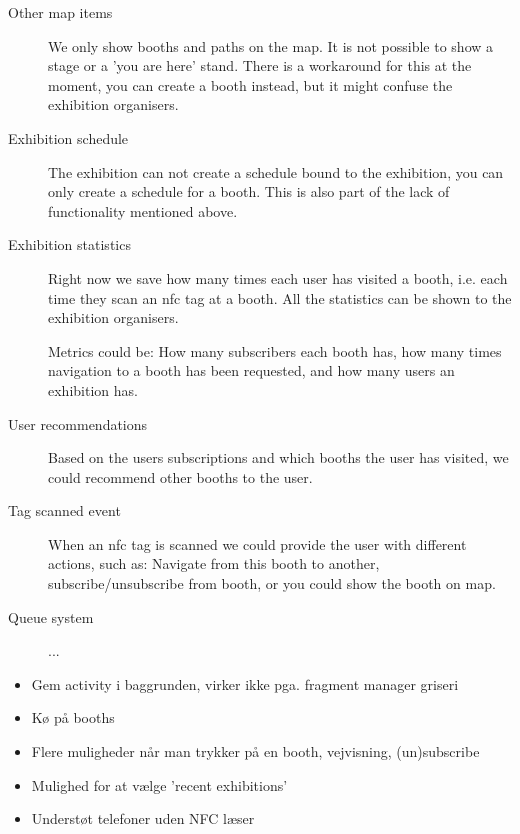 \begin{description}
\item[Other map items] We only show booths and paths on the map. It is not possible to show a stage or a 'you are here' stand. There is a workaround for this at the moment, you can create a booth instead, but it might confuse the exhibition organisers.
\item[Exhibition schedule] The exhibition can not create a schedule bound to the exhibition, you can only create a schedule for a booth. This is also part of the lack of functionality mentioned above.
\item[Exhibition statistics] Right now we save how many times each user has visited a booth, i.e. each time they scan an \ac{nfc} tag at a booth. All the statistics can be shown to the exhibition organisers.

Metrics could be: How many subscribers each booth has, how many times navigation to a booth has been requested, and how many users an exhibition has.
\item[User recommendations] Based on the users subscriptions and which booths the user has visited, we could recommend other booths to the user.
\item[Tag scanned event] When an \ac{nfc} tag is scanned we could provide the user with different actions, such as: Navigate from this booth to another, subscribe/unsubscribe from booth, or you could show the booth on map.
\item[Queue system] ...
\end{description}

\begin{itemize}
\item Gem activity i baggrunden, virker ikke pga. fragment manager griseri
\item Kø på booths
\item Flere muligheder når man trykker på en booth, vejvisning, (un)subscribe
\item Mulighed for at vælge 'recent exhibitions'
\item Understøt telefoner uden NFC læser
\end{itemize}